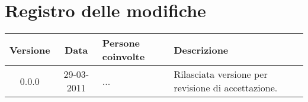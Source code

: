 \section*{Registro delle modifiche}

\begin{tabularx}{\textwidth}{|c|c|p{3.5cm}|X|}
 \hline \textbf{Versione} & \textbf{Data} & \textbf{Persone coinvolte} & \textbf{Descrizione} \\
 \hline 0.0.0 & 29-03-2011 & ... & Rilasciata versione per revisione di accettazione.\\
 \hline
\end{tabularx}